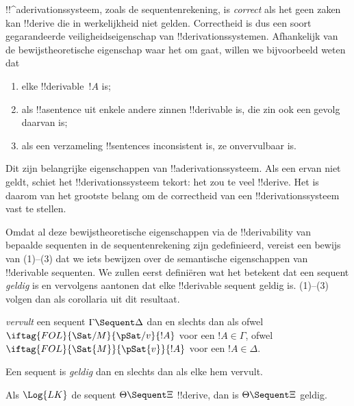 \documentclass[../../../include/open-logic-section]{subfiles}
\begin{document}
      {}
      {}


\begin{explain}
!!^a{derivation}ssysteem, zoals de sequentenrekening, is \emph{correct}
als het geen zaken kan !!{derive} die in werkelijkheid niet gelden.
Correctheid is dus een soort gegarandeerde veiligheidseigenschap van
!!{derivation}ssystemen. Afhankelijk van de bewijstheoretische
eigenschap waar het om gaat, willen we bijvoorbeeld weten dat
\begin{enumerate}
\item elke !!{derivable}~$!A$  is;
\item als !!a{sentence} uit enkele andere zinnen !!{derivable}
  is, die zin ook een gevolg daarvan is;
\item als een verzameling !!{sentence}s inconsistent is, ze
  onvervulbaar is.
\end{enumerate}
Dit zijn belangrijke eigenschappen van !!a{derivation}ssysteem. Als
een ervan niet geldt, schiet het !!{derivation}ssysteem tekort: het zou
te veel !!{derive}. Het is daarom van het grootste belang om de
correctheid van een !!{derivation}ssysteem vast te stellen.

Omdat al deze bewijstheoretische eigenschappen via de
!!{derivability} van bepaalde sequenten in de sequentenrekening zijn
gedefinieerd, vereist een bewijs van (1)--(3) dat we iets bewijzen over
de semantische eigenschappen van !!{derivable} sequenten. We zullen
eerst definiëren wat het betekent dat een sequent \emph{geldig} is en
vervolgens aantonen dat elke !!{derivable} sequent geldig is. (1)--(3)
volgen dan als corollaria uit dit resultaat.
\end{explain}

\begin{defn}
 \emph{vervult} een sequent
$\Gamma \Sequent \Delta$ dan en slechts dan als ofwel
$\iftag{FOL}{\Sat/{M}}{\pSat/{v}}{!A}$ voor een $!A \in \Gamma$, ofwel
$\iftag{FOL}{\Sat{M}}{\pSat{v}}{!A}$ voor een $!A \in \Delta$.

Een sequent is \emph{geldig} dan en slechts dan als elke
hem vervult.
\end{defn}

\begin{thm}[Correctheid]
 Als $\Log{LK}$ de sequent $\Theta
\Sequent \Xi$ !!{derive}, dan is $\Theta \Sequent \Xi$ geldig.
\end{thm}
\end{document}
